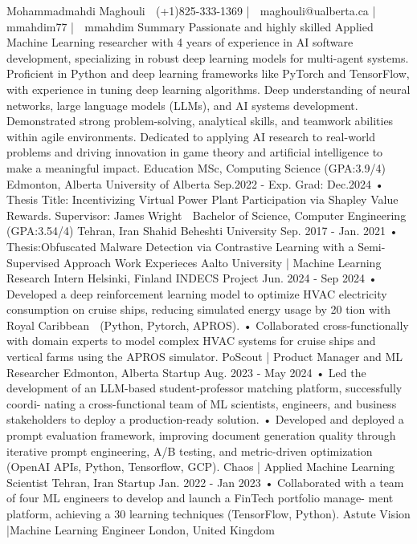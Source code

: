 Mohammadmahdi Maghouli
 (+1)825-333-1369 |  maghouli@ualberta.ca |  mmahdim77 |  mmahdim
Summary
Passionate and highly skilled Applied Machine Learning researcher with 4 years of experience in AI
software development, specializing in robust deep learning models for multi-agent systems. Proficient
in Python and deep learning frameworks like PyTorch and TensorFlow, with experience in tuning
deep learning algorithms. Deep understanding of neural networks, large language models (LLMs),
and AI systems development. Demonstrated strong problem-solving, analytical skills, and teamwork
abilities within agile environments. Dedicated to applying AI research to real-world problems and
driving innovation in game theory and artificial intelligence to make a meaningful impact.
Education
MSc, Computing Science (GPA:3.9/4) Edmonton, Alberta
University of Alberta Sep.2022 - Exp. Grad: Dec.2024
• Thesis Title: Incentivizing Virtual Power Plant Participation via Shapley Value Rewards.
Supervisor: James Wright 
Bachelor of Science, Computer Engineering (GPA:3.54/4) Tehran, Iran
Shahid Beheshti University Sep. 2017 - Jan. 2021
• Thesis:Obfuscated Malware Detection via Contrastive Learning with a Semi-Supervised Approach
Work Experieces
Aalto University | Machine Learning Research Intern Helsinki, Finland
INDECS Project Jun. 2024 - Sep 2024
• Developed a deep reinforcement learning model to optimize HVAC electricity consumption on
cruise ships, reducing simulated energy usage by 20%
tion with Royal Caribbean  (Python, Pytorch, APROS).
• Collaborated cross-functionally with domain experts to model complex HVAC systems for cruise
ships and vertical farms using the APROS simulator.
PoScout | Product Manager and ML Researcher Edmonton, Alberta
Startup Aug. 2023 - May 2024
• Led the development of an LLM-based student-professor matching platform, successfully coordi-
nating a cross-functional team of ML scientists, engineers, and business stakeholders to deploy a
production-ready solution.
• Developed and deployed a prompt evaluation framework, improving document generation quality
through iterative prompt engineering, A/B testing, and metric-driven optimization (OpenAI APIs,
Python, Tensorflow, GCP).
Chaos | Applied Machine Learning Scientist Tehran, Iran
Startup Jan. 2022 - Jan 2023
• Collaborated with a team of four ML engineers to develop and launch a FinTech portfolio manage-
ment platform, achieving a 30%
learning techniques (TensorFlow, Python).
Astute Vision |Machine Learning Engineer London, United Kingdom
